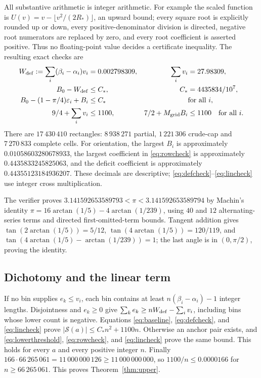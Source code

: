 \documentclass[10pt]{amsart}
\theoremstyle{remark}
\newcommand{\Sset}{\mathcal S}
\begin{document}
All substantive arithmetic is integer arithmetic. For example the
scaled function is $U(v)=v-\lfloor v^2/(2R_*)\rfloor$, an upward
bound; every square root is explicitly rounded up or down, every
positive-denominator division is directed, negative root numerators
are replaced by zero, and every root coefficient is asserted positive.
Thus no floating-point value decides a certificate inequality.
The resulting exact checks are
\begin{align}
 W_{\rm def}:=\sum_i(\beta_i-\alpha_i)v_i&=0.002798309,
 &\sum_i v_i&=27.98309,\label{eq:Wdef}\\
 B_0-W_{\rm def}&\le C_*,
 &C_*&=4435834/10^7,\label{eq:defcheck}\\
 B_0-(1-\pi/4)\varepsilon_i+B_i&\le C_*&&\text{for all }i,\label{eq:rowcheck}\\
 9/4+\sum_i v_i&\le1100,
 &7/2+M_{\rm grid}B_i&\le1100\quad\text{for all }i.\label{eq:lincheck}
\end{align}
There are $17\,430\,410$ rectangles: $8\,938\,271$ partial,
$1\,221\,306$ crude-cap and $7\,270\,833$ complete cells.
For orientation, the largest $B_i$ is approximately
$0.01058603280678933$, the largest coefficient in \eqref{eq:rowcheck}
is approximately $0.4435833245825063$, and the deficit coefficient is
approximately $0.44355123184936207$. These decimals are descriptive;
\eqref{eq:defcheck}--\eqref{eq:lincheck} use integer cross multiplication.

The verifier proves $3.141592653589793<\pi<3.141592653589794$ by
Machin's identity $\pi=16\arctan(1/5)-4\arctan(1/239)$, using $40$
and $12$ alternating-series terms and directed first-omitted-term
bounds. Tangent addition gives $\tan(2\arctan(1/5))=5/12$,
$\tan(4\arctan(1/5))=120/119$, and
$\tan(4\arctan(1/5)-\arctan(1/239))=1$; the last angle is in
$(0,\pi/2)$, proving the identity.

\subsection{Dichotomy and the linear term}
If no bin supplies $e_k\le v_i$, each bin contains at least
$n(\beta_i-\alpha_i)-1$ integer lengths. Disjointness and $e_k\ge0$
give $\sum_ke_k\ge nW_{\rm def}-\sum_iv_i$, including bins whose
lower count is negative. Equations \eqref{eq:baseline},
\eqref{eq:defcheck}, and \eqref{eq:lincheck} prove
$|\Sset(a)|\le C_*n^2+1100n$. Otherwise an anchor pair exists,
and \eqref{eq:lowerthreshold}, \eqref{eq:rowcheck}, and
\eqref{eq:lincheck} prove the same bound. This holds for every $a$
and every positive integer $n$.
Finally $166\cdot66\,265\,061=11\,000\,000\,126\ge11\,000\,000\,000$,
so $1100/n\le0.0000166$ for $n\ge66\,265\,061$.
This proves Theorem~\ref{thm:upper}.
\end{document}
